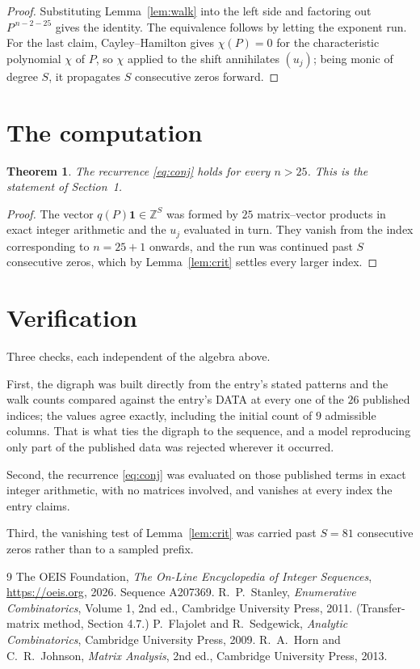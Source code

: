 \documentclass[11pt,a4paper]{article}
\theoremstyle{plain}
\newtheorem{theorem}{Theorem}
\theoremstyle{definition}
\begin{document}
\begin{proof}
Substituting Lemma~\ref{lem:walk} into the left side and factoring out
$P^{\,n-2-25}$ gives the identity. The equivalence follows by letting the exponent
run. For the last claim, Cayley--Hamilton gives $\chi(P)=0$ for the characteristic
polynomial $\chi$ of $P$, so $\chi$ applied to the shift annihilates $(u_j)$; being monic of
degree $S$, it propagates $S$ consecutive zeros forward.
\end{proof}

\section{The computation}

\begin{theorem}
The recurrence \eqref{eq:conj} holds for every $n>25$. This is the statement of
Section~1.
\end{theorem}

\begin{proof}
The vector $q(P)\mathbf{1}\in\mathbb{Z}^{S}$ was formed by $25$ matrix--vector
products in exact integer arithmetic and the $u_j$ evaluated in turn. They vanish from the
index corresponding to $n=25+1$ onwards, and the run was continued past $S$ consecutive
zeros, which by Lemma~\ref{lem:crit} settles every larger index.
\end{proof}

\section{Verification}

Three checks, each independent of the algebra above.

First, the digraph was built directly from the entry's stated patterns and the walk counts
compared against the entry's DATA at every one of the $26$ published indices; the
values agree exactly, including the initial count of $9$ admissible columns. That is
what ties the digraph to the sequence, and a model reproducing only part of the published
data was rejected wherever it occurred.

Second, the recurrence \eqref{eq:conj} was evaluated on those published terms in exact
integer arithmetic, with no matrices involved, and vanishes at every index the entry claims.

Third, the vanishing test of Lemma~\ref{lem:crit} was carried past $S=81$ consecutive
zeros rather than to a sampled prefix.

\begin{thebibliography}{9}
 The OEIS Foundation, \emph{The On-Line Encyclopedia of Integer
Sequences}, \url{https://oeis.org}, 2026. Sequence A207369.
 R.~P.~Stanley, \emph{Enumerative Combinatorics}, Volume 1, 2nd ed.,
Cambridge University Press, 2011. (Transfer-matrix method, Section 4.7.)
 P.~Flajolet and R.~Sedgewick, \emph{Analytic Combinatorics}, Cambridge
University Press, 2009.
 R.~A.~Horn and C.~R.~Johnson, \emph{Matrix Analysis}, 2nd ed., Cambridge
University Press, 2013.
\end{thebibliography}
\end{document}
